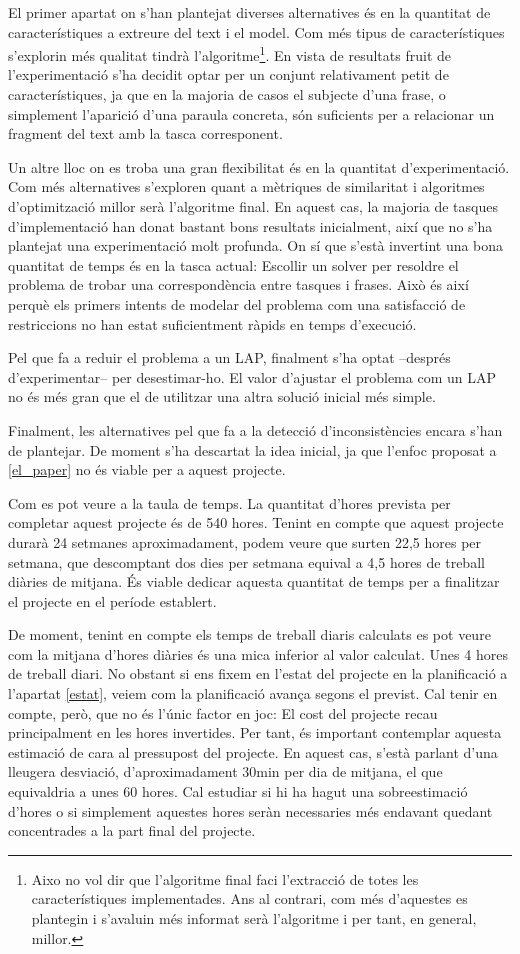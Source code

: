 \documentclass[10pt,a4paper]{article}
\begin{document}
El primer apartat on s'han plantejat diverses alternatives és en la quantitat de característiques a extreure del text i el model. Com més tipus de característiques s'explorin més qualitat tindrà l'algoritme\footnote{Aixo no vol dir que l'algoritme final faci l'extracció de totes les característiques implementades. Ans al contrari, com més d'aquestes es plantegin i s'avaluin més informat serà l'algoritme i per tant, en general, millor.}. En vista de resultats fruit de l'experimentació s'ha decidit optar per un conjunt relativament petit de característiques, ja que en la majoria de casos el subjecte d'una frase, o simplement l'aparició d'una paraula concreta, són suficients per a relacionar un fragment del text amb la tasca corresponent.

Un altre lloc on es troba una gran flexibilitat és en la quantitat d'experimentació. Com més alternatives s'exploren quant a mètriques de similaritat i algoritmes d'optimització millor serà l'algoritme final. En aquest cas, la majoria de tasques d'implementació han donat bastant bons resultats inicialment, així que no s'ha plantejat una experimentació molt profunda. On sí que s'està invertint una bona quantitat de temps és en la tasca actual: Escollir un solver per resoldre el problema de trobar una correspondència entre tasques i frases. Això és així perquè els primers intents de modelar del problema com una satisfacció de restriccions no han estat suficientment ràpids en temps d'execució.

Pel que fa a reduir el problema a un LAP, finalment s'ha optat --després d'experimentar-- per desestimar-ho. El valor d'ajustar el problema com un LAP no és més gran que el de utilitzar una altra solució inicial més simple.

Finalment, les alternatives pel que fa a la detecció d'inconsistències encara s'han de plantejar. De moment s'ha descartat la idea inicial, ja que l'enfoc proposat a \ref{el_paper} no és viable per a aquest projecte.

Com es pot veure a la taula de temps. La quantitat d'hores prevista per completar aquest projecte és de 540 hores. Tenint en compte que aquest projecte durarà 24 setmanes aproximadament, podem veure que surten 22,5 hores per setmana, que descomptant dos dies per setmana equival a 4,5 hores de treball diàries de mitjana. És viable dedicar aquesta quantitat de temps per a finalitzar el projecte en el període establert. 

De moment, tenint en compte els temps de treball diaris calculats es pot veure com la mitjana d'hores diàries és una mica inferior al valor calculat. Unes 4 hores de treball diari. No obstant si ens fixem en l'estat del projecte en la planificació a l'apartat \ref{estat}, veiem com la planificació avança segons el previst. Cal tenir en compte, però, que no és l'únic factor en joc: El cost del projecte recau principalment en les hores invertides. Per tant, és important contemplar aquesta estimació de cara al pressupost del projecte. En aquest cas, s'està parlant d'una lleugera desviació, d'aproximadament 30min per dia de mitjana, el que equivaldria a unes 60 hores. Cal estudiar si hi ha hagut una sobreestimació d'hores o si simplement aquestes hores seràn necessaries més endavant quedant concentrades a la part final del projecte.
\end{document}
